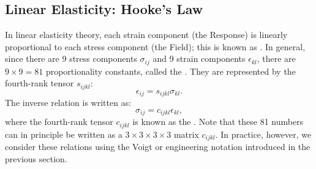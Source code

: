\subsection{Linear Elasticity: Hooke's Law}

In linear elasticity theory, each strain component (the Response) is linearly proportional to each stress component (the Field);  this is known as .  In general, since there are 9 stress components $\sigma_{ij}$ and 9 strain components $\epsilon_{kl}$, there are $9\times9=81$ proportionality constants, called the .  They are  represented by the fourth-rank tensor $s_{ijkl}$: 
\[
\epsilon_{ij}= s_{ijkl}\sigma_{kl}.
\]
The inverse relation is written as:
\[
\sigma_{ij}= c_{ijkl}\epsilon_{kl},
\]
where the fourth-rank tensor $c_{ijkl}$ is known as the . Note that these 81 numbers can in principle be written as a $3\times 3\times 3\times 3$ matrix $c_{ijkl}$.  In practice, however, we consider these relations using the Voigt or engineering notation introduced in the previous section.  


